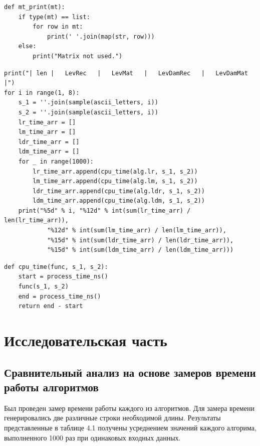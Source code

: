 \documentclass[12pt, a4paper]{report}
\begin{document}
\begin{lstlisting}[label=some-code,caption=Функция вывода матрицы на экран]
def mt_print(mt):
	if type(mt) == list:
		for row in mt:
			print(' '.join(map(str, row)))
	else:
		print("Matrix not used.")
\end{lstlisting}

\begin{lstlisting}[label=some-code,caption=Измерение процессорного времени выполнения алгоритмов]
print("| len |   LevRec   |   LevMat   |   LevDamRec   |   LevDamMat   |")
for i in range(1, 8):
	s_1 = ''.join(sample(ascii_letters, i))
	s_2 = ''.join(sample(ascii_letters, i))
	lr_time_arr = []
	lm_time_arr = []
	ldr_time_arr = []
	ldm_time_arr = []
	for _ in range(1000):
		lr_time_arr.append(cpu_time(alg.lr, s_1, s_2))
		lm_time_arr.append(cpu_time(alg.lm, s_1, s_2))
		ldr_time_arr.append(cpu_time(alg.ldr, s_1, s_2))
		ldm_time_arr.append(cpu_time(alg.ldm, s_1, s_2))
	print("%5d" % i, "%12d" % int(sum(lr_time_arr) / len(lr_time_arr)),
			"%12d" % int(sum(lm_time_arr) / len(lm_time_arr)),
			"%15d" % int(sum(ldr_time_arr) / len(ldr_time_arr)),
			"%15d" % int(sum(ldm_time_arr) / len(ldm_time_arr)))
\end{lstlisting}

\begin{lstlisting}[label=some-code,caption=Функция замера процессорного времени]
def cpu_time(func, s_1, s_2):
	start = process_time_ns()
	func(s_1, s_2)
	end = process_time_ns()
	return end - start
\end{lstlisting}

\chapter{Исследовательская часть}

\section{Сравнительный анализ на основе замеров времени работы алгоритмов}

Был проведен замер времени работы каждого из алгоритмов. 
Для замера времени генерировались две различные строки необходимой длины.
Результаты представленные в таблице 4.1 получены усреднением значений каждого алгорима,  выполненного 1000 раз при одинаковых входных данных.
\end{document}

